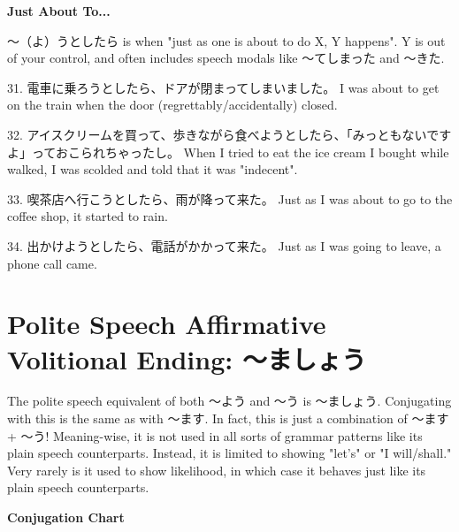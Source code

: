 \begin{center}
 \textbf{Just About To\dothyp{}\dothyp{}\dothyp{} }
\end{center}

\par{ ～（よ）うとしたら is when "just as one is about to do X, Y happens". Y is out of your control, and often includes speech modals like ～てしまった and ～きた. }

\par{31. 電車に乗ろうとしたら、ドアが閉まってしまいました。 \hfill\break
I was about to get on the train when the door (regrettably\slash accidentally) closed. }
 
\par{32. アイスクリームを買って、歩きながら食べようとしたら、「みっともないですよ」っておこられちゃったし。 \hfill\break
When I tried to eat the ice cream I bought while walked, I was scolded and told that it was "indecent". }
 
\par{33. 喫茶店へ行こうとしたら、雨が降って来た。 \hfill\break
Just as I was about to go to the coffee shop, it started to rain. }
 
\par{34. 出かけようとしたら、電話がかかって来た。 \hfill\break
Just as I was going to leave, a phone call came. }
      
\section{Polite Speech Affirmative Volitional Ending: ～ましょう}
 
\par{ The polite speech equivalent of both ～よう and ～う is ～ましょう. Conjugating with this is the same as with ～ます. In fact, this is just a combination of ～ます + ～う! Meaning-wise, it is not used in all sorts of grammar patterns like its plain speech counterparts. Instead, it is limited to showing "let's" or "I will\slash shall." Very rarely is it used to show likelihood, in which case it behaves just like its plain speech counterparts. }

\begin{center}
\textbf{Conjugation Chart }
\end{center}

